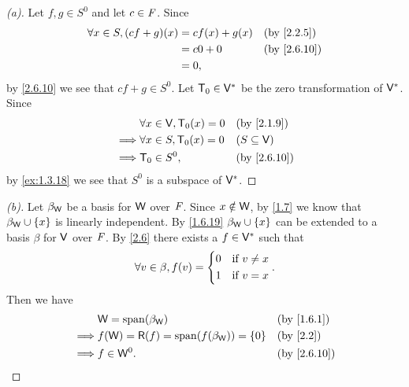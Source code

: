 \begin{proof}[(a)]
  Let \(f, g \in S^0\) and let \(c \in \mathit{F}\).
  Since
  \begin{align*}
    \forall x \in S, (cf + g)(x) & = cf(x) + g(x) &  & \by{2.2.5}  \\
                                 & = c0 + 0       &  & \by{2.6.10} \\
                                 & = 0,
  \end{align*}
  by \cref{2.6.10} we see that \(cf + g \in S^0\).
  Let \(\mathsf{T}_0 \in \mathsf{V}^*\) be the zero transformation of \(\mathsf{V}^*\).
  Since
  \begin{align*}
             & \forall x \in \V, \zT(x) = 0 &  & \by{2.1.9}       \\
    \implies & \forall x \in S, \zT(x) = 0  &  & (S \subseteq \V) \\
    \implies & \zT \in S^0,                 &  & \by{2.6.10}
  \end{align*}
  by \cref{ex:1.3.18} we see that \(S^0\) is a subspace of \(\mathsf{V}^*\).
\end{proof}

\begin{proof}[(b)]
  Let \(\beta_{\mathsf{W}}\) be a basis for \(\mathsf{W}\) over \(\mathit{F}\).
  Since \(x \notin \mathsf{W}\), by \cref{1.7} we know that \(\beta_{\mathsf{W}} \cup \left\lbrace x\right\rbrace\) is linearly independent.
  By \cref{1.6.19} \(\beta_{\mathsf{W}} \cup \left\lbrace x\right\rbrace\) can be extended to a basis \(\beta\) for \(\mathsf{V}\) over \(\mathit{F}\).
  By \cref{2.6} there exists a \(f \in \mathsf{V}^*\) such that
  \[
    \forall v \in \beta, f(v) = \begin{dcases}
      0 & \text{if } v \neq x \\
      1 & \text{if } v = x
    \end{dcases}.
  \]
  Then we have
  \begin{align*}
             & \W = \spn{\beta_{\W}}                          &  & \by{1.6.1}  \\
    \implies & f(\W) = \rg{f} = \spn{f(\beta_{\W})} = \set{0} &  & \by{2.2}    \\
    \implies & f \in \W^0.                                    &  & \by{2.6.10}
  \end{align*}
\end{proof}

